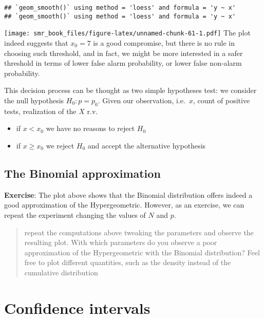 \documentclass[
  oneside]{book}
\providecommand{\tightlist}{%
  \setlength{\itemsep}{0pt}\setlength{\parskip}{0pt}}
\begin{document}
\begin{verbatim}
## `geom_smooth()` using method = 'loess' and formula = 'y ~ x'
## `geom_smooth()` using method = 'loess' and formula = 'y ~ x'
\end{verbatim}

\texttt{[image: smr\_book\_files/figure-latex/unnamed-chunk-61-1.pdf]}
The plot indeed suggests that \(x_0 = 7\) is a good compromise,
but there is no rule in choosing such threshold, and in fact,
we might be more interested in a safer threshold in terms of lower
false alarm probability, or lower false non-alarm probability.

This decision process can be thought as two simple hypotheses test:
we consider the null hypothesis \(H_0: p = p_0\). Given our observation, i.e.~\(x\),
count of positive tests, realization of the \(X\) r.v.

\begin{itemize}
\tightlist
\item
  if \(x < x_0\) we have no reasons to reject \(H_0\)
\item
  if \(x \geq x_0\) we reject \(H_0\) and accept the alternative hypothesis
\end{itemize}

\hypertarget{the-binomial-approximation}{%
\subsection{The Binomial approximation}\label{the-binomial-approximation}}

\textbf{Exercise}: The plot above shows that the Binomial distribution offers indeed
a good approximation of the Hypergeometric. However, as an exercise, we can
repeat the experiment changing the values of \(N\) and \(p\).

\begin{quote}
repeat the computations above tweaking the parameters and observe the
resulting plot. With which parameters do you observe a poor approximation of
the Hypergeometric with the Binomial distribution? Feel free to plot different
quantities, such as the density instead of the cumulative distribution
\end{quote}

\hypertarget{confidence-intervals}{%
\section{Confidence intervals}\label{confidence-intervals}}
\end{document}

